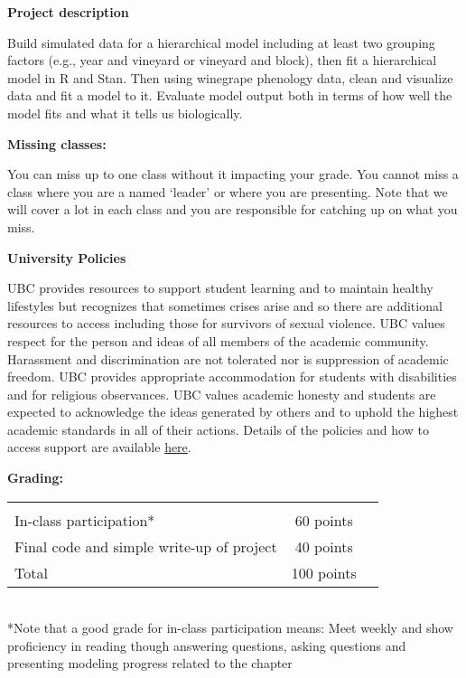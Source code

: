 \documentclass[11pt]{article}
\begin{document}
\begin{large} 
{\raggedright \textbf{Project description}}
\end{large}
Build simulated data for a hierarchical model including at least two grouping factors (e.g., year and vineyard or vineyard and block), then fit a hierarchical model in R and Stan. Then using winegrape phenology data, clean and visualize data and fit a model to it. Evaluate model output both in terms of how well the model fits and what it tells us biologically. \\

\begin{large} 
{\raggedright \textbf{Missing classes:}}
\end{large}
You can miss up to one class without it impacting your grade. You cannot miss a class where you are a named `leader' or where you are presenting. Note that we will cover a lot in each class and you are responsible for catching up on what you miss.\\

\begin{large} 
{\raggedright \textbf{University Policies}}
\end{large}
UBC provides resources to support student learning and to maintain healthy lifestyles but recognizes that sometimes crises arise and so there are additional resources to access including those for survivors of sexual violence. UBC values respect for the person and ideas of all members of the academic community. Harassment and discrimination are not tolerated nor is suppression of academic freedom. UBC provides appropriate accommodation for students with disabilities and for religious observances. UBC values academic honesty and students are expected to acknowledge the ideas generated by others and to uphold the highest academic standards in all of their actions. Details of the policies and how to access support are available \href {https://senate.ubc.ca/policies-resources-guide-students-success}{here}.\\

\begin{large} 
{\raggedright \textbf{Grading:}}
\end{large}

\begin{tabular}{lcr}
& & \\ [-12pt]
In-class participation* & \hspace{14pt} 60 points\\ %
Final code and simple write-up of project & \hspace{14pt} 40 points\\ 
Total & \hspace{14pt} 100 points
\end{tabular}
\vspace{2ex}\\
*Note that a good grade for in-class participation means: Meet weekly and show proficiency in reading though answering questions, asking questions and presenting modeling progress related to the chapter 
\end{document}
